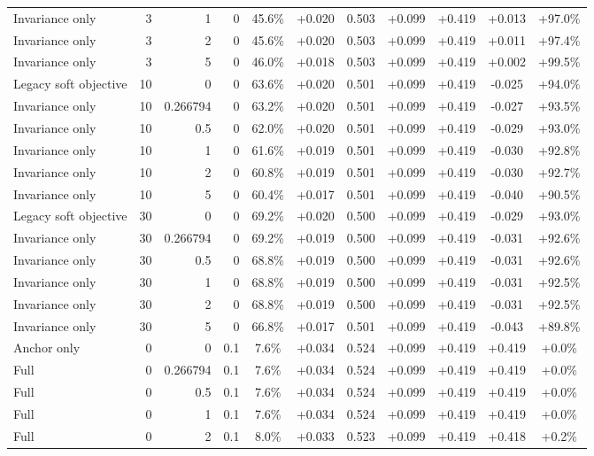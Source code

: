 \begin{table}[htbp]
\begin{tabular}{lrrrccccccc}
Invariance only & 3 & 1 & 0 & 45.6\% & +0.020 & 0.503 & +0.099 & +0.419 & +0.013 & +97.0\% \\
Invariance only & 3 & 2 & 0 & 45.6\% & +0.020 & 0.503 & +0.099 & +0.419 & +0.011 & +97.4\% \\
Invariance only & 3 & 5 & 0 & 46.0\% & +0.018 & 0.503 & +0.099 & +0.419 & +0.002 & +99.5\% \\
Legacy soft objective & 10 & 0 & 0 & 63.6\% & +0.020 & 0.501 & +0.099 & +0.419 & -0.025 & +94.0\% \\
Invariance only & 10 & 0.266794 & 0 & 63.2\% & +0.020 & 0.501 & +0.099 & +0.419 & -0.027 & +93.5\% \\
Invariance only & 10 & 0.5 & 0 & 62.0\% & +0.020 & 0.501 & +0.099 & +0.419 & -0.029 & +93.0\% \\
Invariance only & 10 & 1 & 0 & 61.6\% & +0.019 & 0.501 & +0.099 & +0.419 & -0.030 & +92.8\% \\
Invariance only & 10 & 2 & 0 & 60.8\% & +0.019 & 0.501 & +0.099 & +0.419 & -0.030 & +92.7\% \\
Invariance only & 10 & 5 & 0 & 60.4\% & +0.017 & 0.501 & +0.099 & +0.419 & -0.040 & +90.5\% \\
Legacy soft objective & 30 & 0 & 0 & 69.2\% & +0.020 & 0.500 & +0.099 & +0.419 & -0.029 & +93.0\% \\
Invariance only & 30 & 0.266794 & 0 & 69.2\% & +0.019 & 0.500 & +0.099 & +0.419 & -0.031 & +92.6\% \\
Invariance only & 30 & 0.5 & 0 & 68.8\% & +0.019 & 0.500 & +0.099 & +0.419 & -0.031 & +92.6\% \\
Invariance only & 30 & 1 & 0 & 68.8\% & +0.019 & 0.500 & +0.099 & +0.419 & -0.031 & +92.5\% \\
Invariance only & 30 & 2 & 0 & 68.8\% & +0.019 & 0.500 & +0.099 & +0.419 & -0.031 & +92.5\% \\
Invariance only & 30 & 5 & 0 & 66.8\% & +0.017 & 0.501 & +0.099 & +0.419 & -0.043 & +89.8\% \\
Anchor only & 0 & 0 & 0.1 & 7.6\% & +0.034 & 0.524 & +0.099 & +0.419 & +0.419 & +0.0\% \\
Full & 0 & 0.266794 & 0.1 & 7.6\% & +0.034 & 0.524 & +0.099 & +0.419 & +0.419 & +0.0\% \\
Full & 0 & 0.5 & 0.1 & 7.6\% & +0.034 & 0.524 & +0.099 & +0.419 & +0.419 & +0.0\% \\
Full & 0 & 1 & 0.1 & 7.6\% & +0.034 & 0.524 & +0.099 & +0.419 & +0.419 & +0.0\% \\
Full & 0 & 2 & 0.1 & 8.0\% & +0.033 & 0.523 & +0.099 & +0.419 & +0.418 & +0.2\% \\

\end{tabular}
\end{table}
